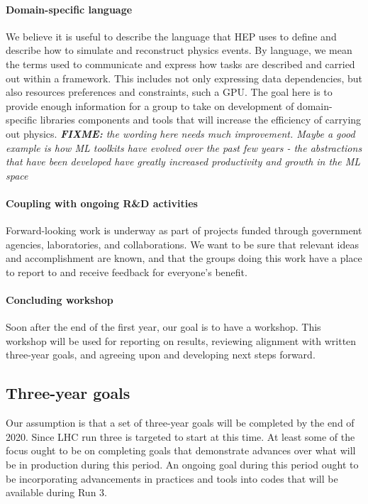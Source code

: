 \documentclass[12pt,a4paper]{article}
\newcommand{\ifixme}[1]{{\slshape\color{cyan}\textbf{FIXME: } #1}}
\begin{document}
\paragraph{Domain-specific language} We believe it is useful to
describe the language that HEP uses to define and describe how to
simulate and reconstruct physics events. By language, we mean the
terms used to communicate and express how tasks are described and
carried out within a framework. This includes not only expressing data
dependencies, but also resources preferences and constraints, such a
GPU. The goal here is to provide enough information for a group to
take on development of domain-specific libraries components and tools
that will increase the efficiency of carrying out physics.
\ifixme{the wording here needs much improvement. Maybe a good example
  is how ML toolkits have evolved over the past few years - the
  abstractions that have been developed have greatly increased
  productivity and growth in the ML space}

\paragraph{Coupling with ongoing R\&D activities} Forward-looking work
is underway as part of projects funded through government agencies,
laboratories, and collaborations. We want to be sure that relevant
ideas and accomplishment are known, and that the groups doing this
work have a place to report to and receive feedback for everyone's
benefit.

\paragraph{Concluding workshop} Soon after the end of the first year,
our goal is to have a workshop. This workshop will be used for
reporting on results, reviewing alignment with written three-year
goals, and agreeing upon and developing next steps forward.

\subsection{Three-year goals}
\label{sec:three-year-goals}

Our assumption is that a set of three-year goals will be completed by
the end of 2020. Since LHC run three is targeted to start at this
time.  At least some of the focus ought to be on completing goals that
demonstrate advances over what will be in production during this
period.  An ongoing goal during this period ought to be incorporating
advancements in practices and tools into codes that will be available
during Run 3.
\end{document}
